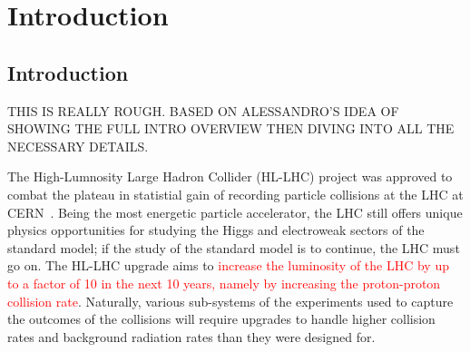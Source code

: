 
\chapter{Introduction}
\label{chap:intro}


\section{Introduction}

THIS IS REALLY ROUGH. BASED ON ALESSANDRO'S IDEA OF SHOWING THE FULL INTRO OVERVIEW THEN DIVING INTO ALL THE NECESSARY DETAILS.

The High-Lumnosity Large Hadron Collider (HL-LHC) project was approved to combat the plateau in statistial gain of recording particle collisions at the LHC at CERN~\cite{hl_lhc_tdr}. Being the most energetic particle accelerator, the LHC still offers unique physics opportunities for studying the Higgs and electroweak sectors of the standard model; if the study of the standard model is to continue, the LHC must go on. The HL-LHC upgrade aims to \textcolor{red}{increase the luminosity of the LHC by up to a factor of 10 in the next 10 years, namely by increasing the proton-proton collision rate}. Naturally, various sub-systems of the experiments used to capture the outcomes of the collisions will require upgrades to handle higher collision rates and background radiation rates than they were designed for. 

